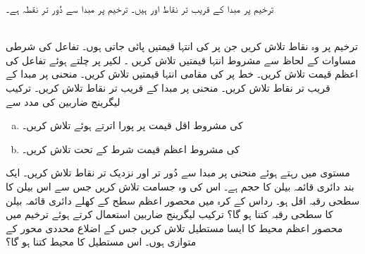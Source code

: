 ترخیم پر مبدا کے قریب تر  نقاط  اور  ہیں۔ ترخیم پر مبدا سے دُور تر نقطہ  ہے۔

\\
ترخیم  پر وہ نقاط تلاش  کریں جن پر  کی انتہا قیمتیں پائی جاتی ہوں۔
تفاعل   کی شرطی مساوات   کے لحاظ سے   مشروط انتہا قیمتیں تلاش کریں ۔
 لکیر  پر چلتے ہوئے  تفاعل  کی اعظم قیمت تلاش کریں۔
خط  پر   کی مقامی  انتہا قیمتیں تلاش کریں۔
منحنی  پر مبدا کے  قریب تر نقاط تلاش کریں۔
منحنی  پر مبدا کے قریب تر نقاط تلاش کریں۔
ترکیب لیگرینج ضاربین کی مدد سے 
\begin{enumerate}[a.]
\item
{} کی مشروط اقل   قیمت    پر پورا اترتے ہوئے تلاش کریں۔ 
\item
{} کی  مشروط اعظم قیمت شرط     کے تحت  تلاش کریں۔
\end{enumerate}
مستوی  میں رہتے ہوئے منحنی  پر مبدا  سے دُور تر اور نزدیک تر نقاط تلاش کریں۔
ایک بند دائری قائمہ  بیلن کا حجم  ہے۔ اس کی وہ جسامت تلاش کریں جس سے اس بیلن کا سطحی رقبہ اقل  ہو۔
رداس  کے کرہ میں محصور   اعظم سطح کے  کھلے  دائری قائمہ بیلن  کا سطحی رقبہ کتنا ہو گا؟ 
ترکیب لیگرینج ضاربین استعمال کرتے ہوئے  ترخیم   میں   محصور      اعظم محیط کا ایسا    مستطیل  تلاش کریں  جس کے اضلاع محددی محور کے متوازی ہوں۔ اس مستطیل کا محیط کتنا ہو گا؟ 
